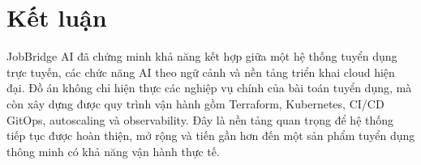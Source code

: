 \documentclass[../DoAn.tex]{subfiles}
\begin{document}
\section{Kết luận}

JobBridge AI đã chứng minh khả năng kết hợp giữa một hệ thống tuyển dụng trực tuyến, các chức năng AI theo ngữ cảnh và nền tảng triển khai cloud hiện đại. Đồ án không chỉ hiện thực các nghiệp vụ chính của bài toán tuyển dụng, mà còn xây dựng được quy trình vận hành gồm Terraform, Kubernetes, CI/CD GitOps, autoscaling và observability. Đây là nền tảng quan trọng để hệ thống tiếp tục được hoàn thiện, mở rộng và tiến gần hơn đến một sản phẩm tuyển dụng thông minh có khả năng vận hành thực tế.
\end{document}
